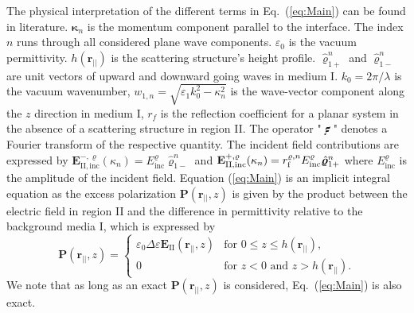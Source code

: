 \documentclass[ floatfix,reprint,amsmath,amssymb,aps,prb]{revtex4-1}
\begin{document}
\begin{widetext}
The physical interpretation of the different terms in Eq.~(\ref{eq:Main}) can be found in literature\cite{Abass2017,Rottenberg:2011}. $\boldsymbol{\kappa}_{n}$ is the momentum component parallel to the interface. The index $n$ runs through all considered plane wave components. $\varepsilon_{0}$ is the vacuum permittivity. $h(\mathbf{r_{||}})$ is the scattering structure's height profile. $\hat{\boldsymbol{\varrho}}^n_{1+}$ and $\hat{\boldsymbol{\varrho}}^n_{1-}$ are unit vectors of upward and downward going waves in medium I. $k_{0}=2\pi/\lambda$ is the vacuum wavenumber, $w_{1,n}=\sqrt{\varepsilon_{1}k_{0}^{2}-\kappa_{n}^{2}}$
is the wave-vector component along the $z$ direction in medium I,
$r_{f}$ is the reflection coefficient for a planar system in the absence of a scattering structure in region II. The operator "$\mathbf{\digamma}$" denotes a Fourier transform of the respective quantity.  The incident field contributions are expressed by $ \mathbf{E}^{-,\mathrm{\varrho}}_{\mathrm{II,inc}}(\kappa_{n})=E_{\mathrm{inc}}^{\varrho}\hat{\boldsymbol{\varrho}}_{1-}^{n} $ and $ \mathbf{E}^{+,\mathrm{\varrho}}_{\mathrm{II,inc}}(\kappa_{n})= r_{\textnormal{f}}^{\varrho,n} E_{\mathrm{inc}}^{\varrho}\hat{\boldsymbol{\varrho}}_{1+}^{n} $ where $E_{\mathrm{inc}}^{\varrho}$ is the amplitude of the incident field. Equation (\ref{eq:Main}) is an implicit integral equation as the excess polarization $\mathbf{P}(\mathbf{r_{||}},z)$ is given by the product between the electric field in region II and the difference in permittivity relative to the background media I, which is expressed by
\begin{equation}
\mathbf{P}(\mathbf{r_{||}},z)=\begin{cases}
\varepsilon_{0}\Delta\varepsilon\mathbf{E}_{\mathrm{II}}(\mathbf{r_{||}},z) & \text{for }0\leq z\leq h(\mathbf{r_{||}}),\\
0 & \text{for }z<0\text{ and }z>h(\mathbf{r_{||}}).
\end{cases}\label{eq:Polarization}
\end{equation}
We note that as long as an exact $\mathbf{P}(\mathbf{r_{||}},z)$ is considered, Eq.~(\ref{eq:Main}) is also exact. 


\end{widetext}
\end{document}
